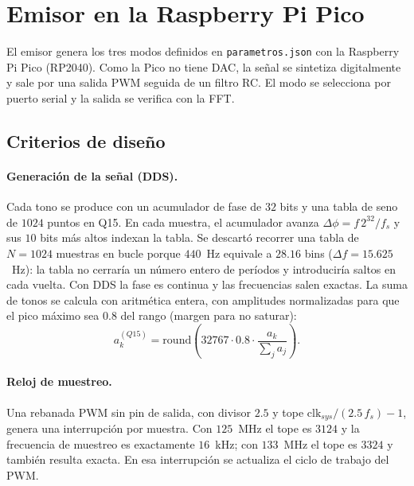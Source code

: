 
\section{Emisor en la Raspberry Pi Pico}
\label{sec:emisor}

El emisor genera los tres modos definidos en \texttt{parametros.json} con la Raspberry Pi Pico (RP2040). Como la Pico no tiene DAC, la señal se sintetiza digitalmente y sale por una salida PWM seguida de un filtro RC. El modo se selecciona por puerto serial y la salida se verifica con la FFT.

\subsection{Criterios de diseño}

\paragraph{Generación de la señal (DDS).} Cada tono se produce con un acumulador de fase de $32$ bits y una tabla de seno de $1024$ puntos en Q15. En cada muestra, el acumulador avanza $\Delta\phi = f\,2^{32}/f_s$ y sus $10$ bits más altos indexan la tabla. Se descartó recorrer una tabla de $N=1024$ muestras en bucle porque $440$~Hz equivale a $28.16$ bins ($\Delta f = 15.625$~Hz): la tabla no cerraría un número entero de períodos y introduciría saltos en cada vuelta. Con DDS la fase es continua y las frecuencias salen exactas. La suma de tonos se calcula con aritmética entera, con amplitudes normalizadas para que el pico máximo sea $0.8$ del rango (margen para no saturar):
\begin{equation}
a_k^{(Q15)} = \mathrm{round}\!\left(32767\cdot 0.8\cdot \frac{a_k}{\sum_j a_j}\right).
\end{equation}

\paragraph{Reloj de muestreo.} Una rebanada PWM sin pin de salida, con divisor $2.5$ y tope $\mathrm{clk}_{sys}/(2.5\,f_s)-1$, genera una interrupción por muestra. Con $125$~MHz el tope es $3124$ y la frecuencia de muestreo es exactamente $16$~kHz; con $133$~MHz el tope es $3324$ y también resulta exacta. En esa interrupción se actualiza el ciclo de trabajo del PWM.

